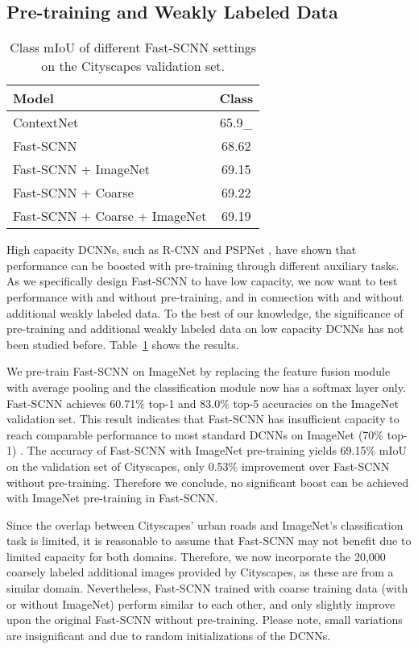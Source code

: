 \documentclass[10pt,twocolumn,letterpaper]{article}
\begin{document}
\subsection{Pre-training and Weakly Labeled Data}
\begin{table}[tb]
\begin{center}
\begin{tabular}{l c}
\hline
\textbf{Model} & \textbf{Class} \\
\hline
	ContextNet \cite{contextnet-poudel2018} & 65.9\_ \\ Fast-SCNN & 68.62 \\ Fast-SCNN + ImageNet & 69.15 \\ Fast-SCNN + Coarse & 69.22 \\ Fast-SCNN + Coarse + ImageNet & 69.19 \\ \hline
\end{tabular}
\end{center}
\caption{Class mIoU of different Fast-SCNN settings on the Cityscapes validation set.}
\label{tbl:comparision-cityscapes-val-set}
\end{table}
High capacity DCNNs, such as R-CNN \cite{rcnn-girshick2013} and PSPNet \cite{pspnet-zhao2017a}, have shown that performance can be boosted with pre-training through different auxiliary tasks.
As we specifically design Fast-SCNN to have low capacity, we now want to test performance with and without pre-training, and in connection with and without additional weakly labeled data. To the best of our knowledge, the significance of pre-training and additional weakly labeled data on low capacity DCNNs has not been studied before. Table~\ref{tbl:comparision-cityscapes-val-set} shows the results.

We pre-train Fast-SCNN on ImageNet \cite{imagenet2015} by replacing the feature fusion module with average pooling and the classification module now has a softmax layer only. Fast-SCNN achieves 60.71\% top-1 and 83.0\% top-5 accuracies on the ImageNet validation set. This result indicates that Fast-SCNN has insufficient capacity to reach comparable performance to most standard DCNNs on ImageNet (70\% top-1) \cite{mobilenet-howard2017,inverted-res-bottlenecks-sandler2018}. The accuracy of Fast-SCNN with ImageNet pre-training yields 69.15\% mIoU on the validation set of Cityscapes, only 0.53\% improvement over Fast-SCNN without pre-training. Therefore we conclude, no significant boost can be achieved with ImageNet pre-training in Fast-SCNN.

Since the overlap between Cityscapes' urban roads and ImageNet's classification task is limited, it is reasonable to assume that Fast-SCNN may not benefit due to limited capacity for both domains. Therefore, we now incorporate the 20,000 coarsely labeled additional images provided by Cityscapes, as these are from a similar domain. Nevertheless, Fast-SCNN trained with coarse training data (with or without ImageNet) perform similar to each other, and only slightly improve upon the original Fast-SCNN without pre-training. Please note, small variations are insignificant and due to random initializations of the DCNNs.
\end{document}
